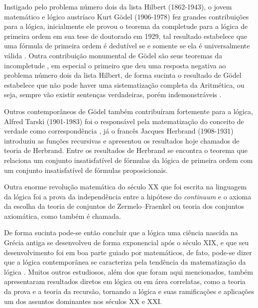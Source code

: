 Instigado pelo problema número dois da lista Hilbert (1862-1943), o jovem matemático e lógico austríaco Kurt Gödel (1906-1978) fez grandes contribuições para a lógica, inicialmente ele provou o teorema da completude para a lógica de primeira ordem em sua tese de doutorado em 1929, tal resultado estabelece que uma fórmula de primeira ordem é dedutível se e somente se ela é universalmente válida \cite{benja-Logica}. Outra contribuição monumental de Gödel são seus teoremas da incompletude \cite{godel1931}, em especial o primeiro que deu uma resposta negativa ao problema número dois da lista Hilbert, de forma sucinta o resultado de Gödel estabelece que não pode haver uma sistematização completa da Aritmética, ou seja, sempre vão existir sentenças verdadeiras, porém indemonstráveis \cite{abe2002-logica, magnus2020}.

Outros contemporâneos de Gödel também contribuíram fortemente para a lógica, Alfred Tarski (1901-1983) foi o responsável pela matematização do conceito de verdade como correspondência \cite{abe2002-logica, tarski1983}, já o francês Jacques Herbrand (1908-1931) introduziu as funções recursivas e apresentou os resultados hoje chamados de teoria de Herbrand. Entre os resultados de Herbrand se encontra o teorema que relaciona um conjunto insatisfatível de fórmulas da lógica de primeira ordem com um conjunto insatisfatível de fórmulas proposicionais.

Outra enorme revolução matemática do século XX que foi escrita na linguagem da lógica foi a prova da independência entre a hipótese do \textit{continuum} e o axioma da escolha da teoria de conjuntos de Zermelo–Fraenkel ou teoria dos conjuntos axiomática, como também é chamada.

De forma sucinta pode-se então concluir que a lógica uma ciência nascida na Grécia antiga se desenvolveu de forma exponencial após o século XIX, e que seu desenvolvimento foi em boa parte guiado por matemáticos, de fato, pode-se dizer que a lógica contemporânea se caracteriza pela tendência da matematização da lógica \cite{barreto}. Muitos outros estudiosos, além dos que foram aqui mencionados, também apresentaram resultados diretos em lógica ou em área correlatas, como a teoria da prova e a teoria da recursão, tornando a lógica e suas ramificações e aplicações um dos assuntos dominantes nos séculos XX e XXI.

